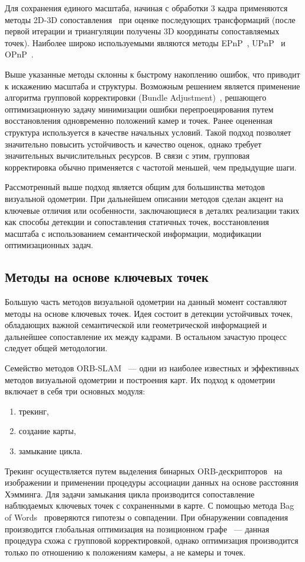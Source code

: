 Для сохранения единого масштаба, начиная с обработки 3 кадра применяются методы 2D-3D 
сопоставления~\cite{li2012robust} при оценке последующих трансформаций (после первой итерации и триангуляции получены
3D координаты сопоставляемых точек). Наиболее широко используемыми являются методы 
EPnP~\cite{lepetit2009ep}, UPnP~\cite{kneip2014upnp} и OPnP~\cite{zheng2013revisiting}. 

Выше указанные методы склонны к быстрому накоплению ошибок, что приводит к искажению 
масштаба и структуры. Возможным решением является применение алгоритма групповой корректировки
(Bundle Adjustment)~\cite{triggs2000bundle}, решающего оптимизационную задачу минимизации ошибки перепроецирования 
путем восстановления одновременно положений камер и точек. Ранее оцененная структура
используется в качестве начальных условий. Такой подход позволяет значительно повысить
устойчивость и качество оценок, однако требует значительных вычислительных ресурсов. 
В связи с этим, групповая корректировка обычно применяется с частотой меньшей, чем предыдущие
шаги.

Рассмотренный выше подход является общим для большинства методов визуальной одометрии. 
При дальнейшем описании методов
сделан акцент на ключевые отличия или особенности, заключающиеся в 
деталях реализации таких как способы детекции и сопоставления статичных точек, 
восстановления масштаба с использованием семантической информации, модификации 
оптимизационных задач.

\subsection{Методы на основе ключевых точек}
Большую часть методов визуальной одометрии на данный момент составляют методы на 
основе ключевых точек. Идея состоит в детекции устойчивых точек, обладающих важной 
семантической или геометрической информацией и дальнейшее сопоставление их 
между кадрами. В остальном зачастую процесс следует общей методологии. 

Семейство методов ORB-SLAM~\cite{mur2015orb}\cite{mur2017orb}\cite{campos2021orb} --- 
одни из наиболее известных и эффективных методов визуальной 
одометрии и построения карт. Их подход к одометрии включает в себя три основных модуля: 
\begin{enumerate}
    \item трекинг,
    \item создание карты,
    \item замыкание цикла.
\end{enumerate}
Трекинг осуществляется путем выделения бинарных ORB-дескрипторов~\cite{rublee2011orb} на изображении и применении 
процедуры ассоциации данных на основе расстояния Хэмминга. Для задачи замыкания
цикла производится сопоставление наблюдаемых ключевых точек с сохраненными в карте.
С помощью метода Bag of Words~\cite{qader2019overview} проверяются гипотезы о совпадении. При обнаружении совпадения
производится глобальная оптимизация на позиционном графе~\cite{kummerle2011g} --- данная процедура схожа с 
групповой корректировкой, однако оптимизация производится только по отношению к
положениям камеры, а не камеры и точек.

